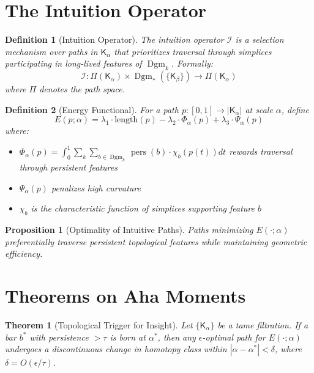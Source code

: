 \documentclass[11pt]{article}
\newtheorem{definition}{Definition}[section]
\newtheorem{theorem}{Theorem}[section]
\newtheorem{proposition}{Proposition}[section]
\DeclareMathOperator{\pers}{pers}
\DeclareMathOperator{\Dgm}{Dgm}
\begin{document}
\section{The Intuition Operator}

\begin{definition}[Intuition Operator]
The intuition operator $\mathcal{I}$ is a selection mechanism over paths in $\mathsf{K}_\alpha$ that prioritizes traversal through simplices participating in long-lived features of $\Dgm_k$. Formally:
$$\mathcal{I}: \Pi(\mathsf{K}_\alpha) \times \Dgm_*(\{\mathsf{K}_\beta\}) \to \Pi(\mathsf{K}_\alpha)$$
where $\Pi$ denotes the path space.
\end{definition}

\begin{definition}[Energy Functional]
For a path $p: [0,1] \to |\mathsf{K}_\alpha|$ at scale $\alpha$, define 
$$E(p;\alpha) = \lambda_1 \cdot \text{length}(p) - \lambda_2 \cdot \Phi_\alpha(p) + \lambda_3 \cdot \Psi_\alpha(p)$$
where:
\begin{itemize}
    \item $\Phi_\alpha(p) = \int_0^1 \sum_{k} \sum_{b \in \Dgm_k} \pers(b) \cdot \chi_{b}(p(t)) dt$ rewards traversal through persistent features
    \item $\Psi_\alpha(p)$ penalizes high curvature
    \item $\chi_b$ is the characteristic function of simplices supporting feature $b$
\end{itemize}
\end{definition}

\begin{proposition}[Optimality of Intuitive Paths]
Paths minimizing $E(\cdot; \alpha)$ preferentially traverse persistent topological features while maintaining geometric efficiency.
\end{proposition}

\section{Theorems on Aha Moments}

\begin{theorem}[Topological Trigger for Insight]
\label{thm:trigger}
Let $\{\mathsf{K}_\alpha\}$ be a tame filtration. If a bar $b^*$ with persistence $> \tau$ is born at $\alpha^*$, then any $\epsilon$-optimal path for $E(\cdot;\alpha)$ undergoes a discontinuous change in homotopy class within $|\alpha-\alpha^*|<\delta$, where $\delta = O(\epsilon/\tau)$.
\end{theorem}
\end{document}
